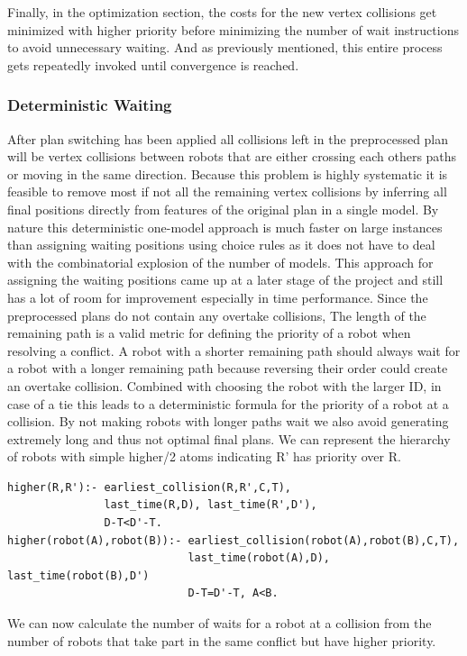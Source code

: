 \documentclass{llncs}
\begin{document}
Finally, in the optimization section, the costs for the new vertex collisions get minimized with higher priority before minimizing the number of wait instructions to avoid unnecessary waiting.
And as previously mentioned, this entire process gets repeatedly invoked until convergence is reached.

\subsubsection{Deterministic Waiting}
After plan switching has been applied all collisions left in the preprocessed plan will be vertex collisions between robots that are either crossing each others paths or moving in the same direction.
Because this problem is highly systematic it is feasible to remove most if not all the remaining vertex collisions by inferring all final positions directly from features of the original plan in a single model. By nature this deterministic one-model approach is much faster on large instances than assigning waiting positions using choice rules as it does not have to deal with the combinatorial explosion of the number of models.
This approach for assigning the waiting positions came up at a later stage of the project and still has a lot of room for improvement especially in time performance.
Since the preprocessed plans do not contain any overtake collisions, The length of the remaining path is a valid metric for defining the priority of a robot when resolving a conflict. A robot with a shorter remaining path should always wait for a robot with a longer remaining path because reversing their order could create an overtake collision. Combined with choosing the robot with the larger ID, in case of a tie this leads to a deterministic formula for the priority of a robot at a collision.
By not making robots with longer paths wait we also avoid generating extremely long and thus not optimal final plans. 
We can represent the hierarchy of robots with simple higher/2 atoms indicating R' has priority over R.
\begin{verbatim}
higher(R,R'):- earliest_collision(R,R',C,T), 
               last_time(R,D), last_time(R',D'),
               D-T<D'-T.
higher(robot(A),robot(B)):- earliest_collision(robot(A),robot(B),C,T),
                            last_time(robot(A),D), last_time(robot(B),D')
                            D-T=D'-T, A<B.  
\end{verbatim}
We can now calculate the number of waits for a robot at a collision from the number of robots that take part in the same conflict but have higher priority.
\end{document}
